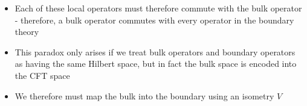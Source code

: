 \documentclass[12pt,a4paper]{article}
\numberwithin{equation}{section}
\begin{document}
\begin{itemize}
		\item Each of these local operators must therefore commute with the bulk operator - therefore, a bulk operator commutes with every operator in the boundary theory
		\item This paradox only arises if we treat bulk operators and boundary operators as having the same Hilbert space, but in fact the bulk space is encoded into the CFT space
		\item We therefore must map the bulk into the boundary using an isometry $V$
	\end{itemize}
\end{document}
